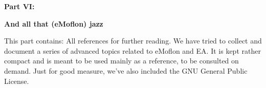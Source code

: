 \vspace*{2cm}

{\bf \huge Part VI:}
\vspace{1cm}

{\Huge \bf And all that (eMoflon) jazz}
\vspace{1cm}

\genHeader

This part contains: All references for further reading. We have tried to collect and document a series of advanced topics related to eMoflon and EA. It is kept
rather compact and is meant to be used mainly as a reference, to be consulted on demand. Just for good measure, we've also included the GNU General Public
License.
















